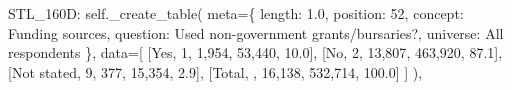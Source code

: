 \documentclass[
  11pt,
  a4paper,
]{article}
\newenvironment{Shaded}{\begin{snugshade}}{\end{snugshade}}
\newcommand{\NormalTok}[1]{\textcolor[rgb]{0.00,0.23,0.31}{#1}}
\newcommand{\OperatorTok}[1]{\textcolor[rgb]{0.37,0.37,0.37}{#1}}
\newcommand{\StringTok}[1]{\textcolor[rgb]{0.13,0.47,0.30}{#1}}
\newcommand{\VariableTok}[1]{\textcolor[rgb]{0.07,0.07,0.07}{#1}}
\begin{document}
\begin{Shaded}
\begin{Highlighting}[]
            \StringTok{\textquotesingle{}STL\_160D\textquotesingle{}}\NormalTok{: }\VariableTok{self}\NormalTok{.\_create\_table(}
\NormalTok{                meta}\OperatorTok{=}\NormalTok{\{}
                    \StringTok{\textquotesingle{}length\textquotesingle{}}\NormalTok{: }\StringTok{\textquotesingle{}1.0\textquotesingle{}}\NormalTok{, }\StringTok{\textquotesingle{}position\textquotesingle{}}\NormalTok{: }\StringTok{\textquotesingle{}52\textquotesingle{}}\NormalTok{,}
                    \StringTok{\textquotesingle{}concept\textquotesingle{}}\NormalTok{: }\StringTok{\textquotesingle{}Funding sources\textquotesingle{}}\NormalTok{,}
                    \StringTok{\textquotesingle{}question\textquotesingle{}}\NormalTok{: }\StringTok{\textquotesingle{}Used non{-}government grants/bursaries?\textquotesingle{}}\NormalTok{,}
                    \StringTok{\textquotesingle{}universe\textquotesingle{}}\NormalTok{: }\StringTok{\textquotesingle{}All respondents\textquotesingle{}}
\NormalTok{                \},}
\NormalTok{                data}\OperatorTok{=}\NormalTok{[}
\NormalTok{                    [}\StringTok{\textquotesingle{}Yes\textquotesingle{}}\NormalTok{, }\StringTok{\textquotesingle{}1\textquotesingle{}}\NormalTok{, }\StringTok{\textquotesingle{}1,954\textquotesingle{}}\NormalTok{, }\StringTok{\textquotesingle{}53,440\textquotesingle{}}\NormalTok{, }\StringTok{\textquotesingle{}10.0\textquotesingle{}}\NormalTok{],}
\NormalTok{                    [}\StringTok{\textquotesingle{}No\textquotesingle{}}\NormalTok{, }\StringTok{\textquotesingle{}2\textquotesingle{}}\NormalTok{, }\StringTok{\textquotesingle{}13,807\textquotesingle{}}\NormalTok{, }\StringTok{\textquotesingle{}463,920\textquotesingle{}}\NormalTok{, }\StringTok{\textquotesingle{}87.1\textquotesingle{}}\NormalTok{],}
\NormalTok{                    [}\StringTok{\textquotesingle{}Not stated\textquotesingle{}}\NormalTok{, }\StringTok{\textquotesingle{}9\textquotesingle{}}\NormalTok{, }\StringTok{\textquotesingle{}377\textquotesingle{}}\NormalTok{, }\StringTok{\textquotesingle{}15,354\textquotesingle{}}\NormalTok{, }\StringTok{\textquotesingle{}2.9\textquotesingle{}}\NormalTok{],}
\NormalTok{                    [}\StringTok{\textquotesingle{}Total\textquotesingle{}}\NormalTok{, }\StringTok{\textquotesingle{}\textquotesingle{}}\NormalTok{, }\StringTok{\textquotesingle{}16,138\textquotesingle{}}\NormalTok{, }\StringTok{\textquotesingle{}532,714\textquotesingle{}}\NormalTok{, }\StringTok{\textquotesingle{}100.0\textquotesingle{}}\NormalTok{]}
\NormalTok{                ]}
\NormalTok{            ),}
            

\end{Highlighting}
\end{Shaded}
\end{document}
